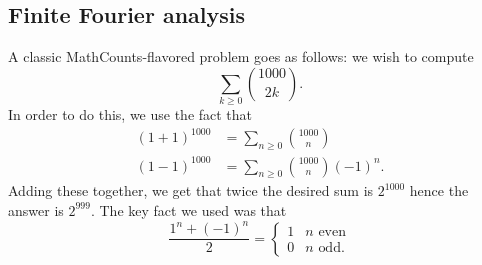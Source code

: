 \documentclass[11pt]{scrartcl}
\begin{document}
\subsection{Finite Fourier analysis}
A classic MathCounts-flavored problem goes as follows:
we wish to compute
\[ \sum_{k \ge 0} \binom{1000}{2k}. \]
In order to do this, we use the fact that
\begin{align*}
	(1+1)^{1000} &= \sum_{n \ge 0} \binom{1000}{n}  \\
	(1-1)^{1000} &= \sum_{n \ge 0} \binom{1000}{n}(-1)^n. 
\end{align*}
Adding these together, we get that twice the desired sum is $2^{1000}$
hence the answer is $2^{999}$.
The key fact we used was that
\[ \frac{1^n + (-1)^n}{2}
	= \begin{cases}
		1 & n \text{ even} \\
		0 & n \text{ odd}.
	\end{cases}
\]
\end{document}
